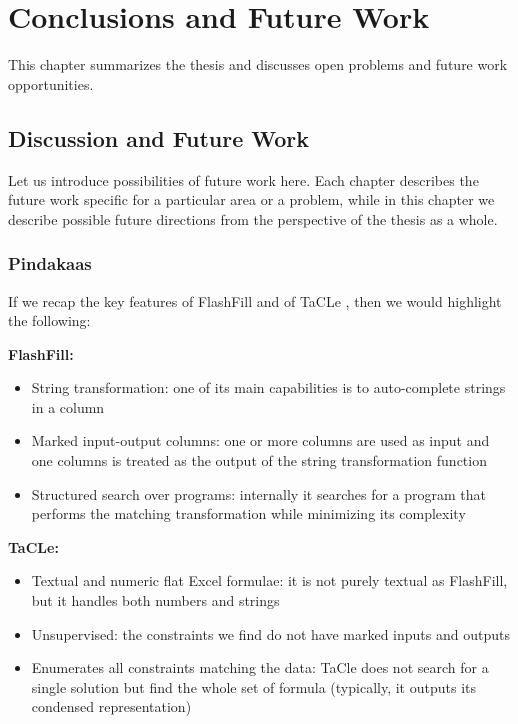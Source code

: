 \chapter{Conclusions and Future Work}\label{ch:conclusions}
\begin{addmargin}[2em]{2em}
This chapter summarizes the thesis and discusses open problems and
future work opportunities.
\end{addmargin}

\section{Discussion and Future Work}
Let us introduce possibilities of future work here. Each chapter
describes the future work specific for a particular area or a problem,
while in this chapter we describe possible future directions from the
perspective of the thesis as a whole.

\subsection{Pindakaas}
If we recap the key features of FlashFill \parencite{flashfill} and of TaCLe
\parencite{tacle}, then we would highlight the following:

\textbf{FlashFill:}
\begin{itemize}
\item String transformation: one of its main capabilities is to
  auto-complete strings in a column 
\item Marked input-output columns: one or more columns are used as
  input and one columns is treated as the output of the string
  transformation function
\item Structured search over programs: internally it searches for a
  program that performs the matching transformation while minimizing
  its complexity
\end{itemize}

\textbf{TaCLe:}
\begin{itemize}
  \item Textual and numeric flat Excel formulae: it is not purely
    textual as FlashFill, but it handles both numbers and strings
  \item Unsupervised: the constraints we find do not have marked
    inputs and outputs
  \item Enumerates all constraints matching the data: TaCle does not
    search for a single solution but find the whole set of formula
    (typically, it outputs its condensed representation)
\end{itemize}

